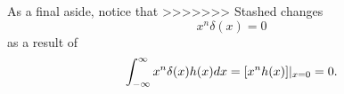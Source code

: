    



As a final aside, notice that
>>>>>>> Stashed changes
\begin{equation}
    x^n\delta(x)=0
\end{equation}
as a result of
\begin{equation}
    \int_{-\infty}^{\infty} x^n\delta(x)h(x)dx=[x^nh(x)]|_{x=0} = 0.
\end{equation}



